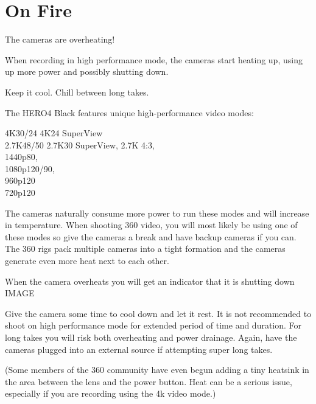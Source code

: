 \chapter{On Fire}
\pagecolor{white}
\label{chap:19}
\begin{fullwidth}


\problem

{\large The cameras are overheating!


 \par}

When recording in high performance mode, the cameras start heating up, using up more power and possibly shutting down. 


\solution

{\large Keep it cool. Chill between long takes. 


 \par}

The HERO4 Black features unique high-performance video modes: 

4K30/24 4K24 SuperView
\\
2.7K48/50 2.7K30 SuperView, 2.7K 4:3, 
\\
1440p80, 
\\
1080p120/90, 
\\
960p120 
\\
720p120

The cameras naturally consume more power to run these modes and will increase in temperature. When shooting 360 video, you will most likely be using one of these modes so give the cameras a break and have backup cameras if you can. The 360 rigs pack multiple cameras into a tight formation and the cameras generate even more heat next to each other. 

When the camera overheats you will get an indicator that it is shutting down
	      IMAGE
                 
Give the camera some time to cool down and let it rest. It is not recommended to shoot on high performance mode for extended period of time and duration. For long takes you will risk both overheating and power drainage. Again, have the cameras plugged into an external source if attempting super long takes. 

(Some members of the 360 community have even begun adding a tiny heatsink in the area between the lens and the power button. Heat can be a serious issue, especially if you are recording using the 4k video mode.)






\clearpage
\end{fullwidth}
